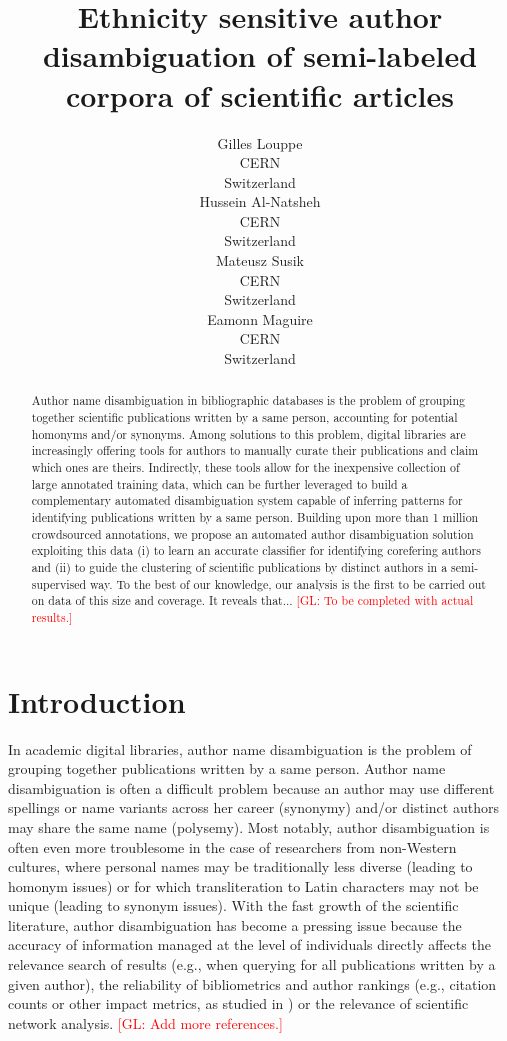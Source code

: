 \documentclass{article}
\title{Ethnicity sensitive author disambiguation of semi-labeled corpora of scientific articles}
\author{Gilles Louppe\\
        CERN\\
        Switzerland\\
\And Hussein Al-Natsheh\\
        CERN\\
        Switzerland\\
\And Mateusz Susik\\
        CERN\\
        Switzerland\\
\And Eamonn Maguire\\
        CERN\\
        Switzerland}
\date{}
\newcommand{\glnote}[1]{\textcolor{red}{[GL: #1]}}
\begin{document}
\maketitle

\begin{abstract}

Author name disambiguation in bibliographic databases is the problem of
grouping together scientific publications written by a same person, accounting
for potential homonyms and/or synonyms. Among solutions to this problem,
digital libraries are increasingly offering tools for authors to manually
curate their publications and claim which ones are theirs. Indirectly, these
tools allow for the inexpensive collection of large annotated training data,
which can be further leveraged to build a complementary automated
disambiguation system capable of inferring patterns for identifying
publications written by a same person.  Building upon more than 1 million
crowdsourced annotations, we propose an automated author disambiguation
solution exploiting this data (i) to learn an accurate classifier for
identifying corefering authors and (ii) to guide the clustering of scientific
publications by distinct authors in a semi-supervised way. To the best of our
knowledge, our analysis is the first to be carried out on data of this size and
coverage. It reveals that... \glnote{To be completed with actual results.}

\end{abstract}



\section{Introduction}
\label{introduction}


In academic digital libraries, author name disambiguation is the problem of
grouping together publications written by a same person.  Author name
disambiguation is often a difficult problem because an author may use different
spellings or name variants across her career (synonymy) and/or distinct authors may
share the same name (polysemy). Most notably, author disambiguation is often even more
troublesome in the case of researchers from non-Western cultures, where
personal names may be traditionally less diverse (leading to homonym issues) or
for which transliteration to Latin characters may not be unique (leading to
synonym issues). With the fast growth of the scientific literature, author
disambiguation has become a pressing issue because the accuracy of information
managed at the level of individuals directly affects the relevance search of
results (e.g., when querying for all publications written by a given author),
the reliability of bibliometrics and author rankings (e.g., citation counts or other impact
metrics, as studied in \citep{strotmann2012author}) or the relevance of scientific network analysis.
\glnote{Add more references.}
\end{document}
